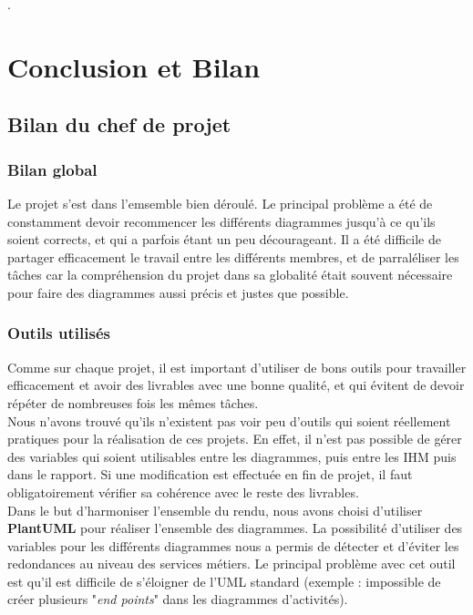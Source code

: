 .

\chapter*{Conclusion et Bilan}
\setcounter{section}{0}


\section*{Bilan du chef de projet}

\subsection*{Bilan global}
Le projet s'est dans l'emsemble bien déroulé. Le principal problème a été de constamment devoir recommencer les différents diagrammes jusqu'à ce qu'ils soient corrects, et qui a parfois étant un peu décourageant. Il a été difficile de partager efficacement le travail entre les différents membres, et de parraléliser les tâches car la compréhension du projet dans sa globalité était souvent nécessaire pour faire des diagrammes aussi précis et justes que possible.

\subsection*{Outils utilisés}
Comme sur chaque projet, il est important d'utiliser de bons outils pour travailler efficacement et avoir des livrables avec une bonne qualité, et qui évitent de devoir répéter de nombreuses fois les mêmes tâches.\\

Nous n'avons trouvé qu'ils n'existent pas voir peu d'outils qui soient réellement pratiques pour la réalisation de ces projets. En effet, il n'est pas possible de gérer des variables qui soient utilisables entre les diagrammes, puis entre les IHM puis dans le rapport. Si une modification est effectuée en fin de projet, il faut obligatoirement vérifier sa cohérence avec le reste des livrables.\\

Dans le but d'harmoniser l'ensemble du rendu, nous avons choisi d'utiliser \textbf{PlantUML} pour réaliser l'ensemble des diagrammes. La possibilité d'utiliser des variables pour les différents diagrammes nous a permis de détecter et d'éviter les redondances au niveau des services métiers. Le principal problème avec cet outil est qu'il est difficile de s'éloigner de l'UML standard (exemple : impossible de créer plusieurs "\textit{end points}" dans les diagrammes d'activités).\\

